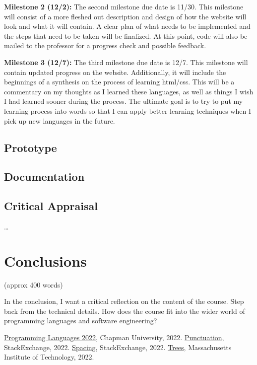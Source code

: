 \documentclass{article}
\theoremstyle{theorem}
\theoremstyle{definition}
\theoremstyle{remark}
\begin{document}
\noindent\textbf{Milestone 2 (12/2):}
\newline\indent
The second milestone due date is 11/30. This milestone will consist of a more fleshed out description and design of how the website will look and what it will contain. A clear plan of what needs to be implemented and the steps that need to be taken will be finalized. At this point, code will also be mailed to the professor for a progress check and possible feedback.\newline

\noindent\textbf{Milestone 3 (12/7):}
\newline\indent
The third milestone due date is 12/7. This milestone will contain updated progress on the website. Additionally, it will include the beginnings of a synthesis on the process of learning html/css. This will be a commentary on my thoughts as I learned these languages, as well as things I wish I had learned sooner during the process. The ultimate goal is to try to put my learning process into words so that I can apply better learning techniques when I pick up new languages in the future.

\subsection{Prototype}
\subsection{Documentation}
\subsection{Critical Appraisal}

\ldots

\section{Conclusions}\label{conclusions}

(approx 400 words)

In the conclusion, I want a critical reflection on the content of the course. Step back from the technical details. How does the course fit into the wider world of programming languages and software engineering?

\begin{thebibliography}{99}
 \href{https://github.com/alexhkurz/programming-languages-2022/blob/main/README.md}{Programming Languages 2022}, Chapman University, 2022.
 \href{https://tex.stackexchange.com/questions/2369/why-do-the-less-than-symbol-and-the-greater-than-symbol-appear-wrong-as}{Punctuation}, StackExchange, 2022.
 \href{https://tex.stackexchange.com/questions/14526/spaces-behind-textgreater-not-working-as-expected}{Spacing}, StackExchange, 2022.
 \href{http://sznfong.scripts.mit.edu/site/wp-content/uploads/2018/03/treedrawingtutorialv2.pdf}{Trees}, Massachusetts Institute of Technology, 2022.
\end{thebibliography}
\end{document}
